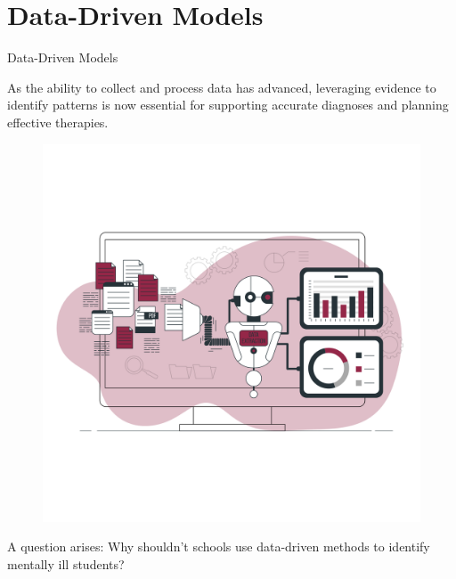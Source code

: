 \documentclass[10pt, xcolor=table]{beamer}
\begin{document}
\section*{Data-Driven Models}

\begin{frame}{Data-Driven Models}

	As the ability to collect and process data has advanced, leveraging evidence to identify patterns is now essential for supporting accurate diagnoses and planning effective therapies.
	
	\vspace{-1.5cm}
	
	\begin{figure}
	\centering
	\includegraphics[width=0.6\linewidth]{./figures/data_driven.png}
	\end{figure}		
	
	\vspace{-1.5cm}
	A question arises: Why shouldn't schools use data-driven methods to identify mentally ill students? \cite{DEHGHANBONARI2023100238}
\end{frame}
\end{document}
